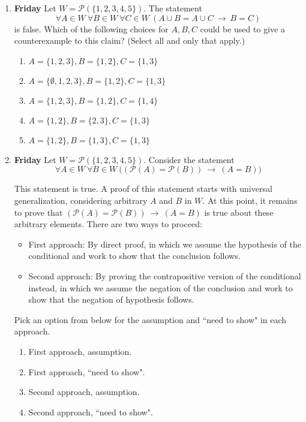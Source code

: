 \documentclass[12pt, oneside]{article}
\begin{document}
\begin{enumerate}
\item {\bf Friday} Let $W =  \mathcal{P}(\{1,2,3,4,5\})$.
The statement $$\forall A \in W~ \forall B\in W~ \forall  C  \in W~  ( A \cup B =  A \cup C ~\to~  B = C) $$ is false.
Which of the following  choices for  $A, B, C$ could  
be used to  give a counterexample to this claim?
(Select all and only that  apply.)
\begin{enumerate}
    \item $A = \{ 1, 2, 3 \}, B = \{ 1, 2\}, C= \{1, 3\}$
    \item $A = \{ \emptyset, 1, 2, 3 \}, B = \{ 1, 2\}, C= \{1, 3\}$
    \item $A = \{ 1, 2, 3 \}, B = \{ 1, 2\}, C= \{1, 4\}$
    \item $A = \{ 1, 2 \}, B = \{ 2, 3\}, C= \{1, 3\}$
    \item $A = \{ 1,2 \}, B =  \{ 1,3\}, C =  \{ 1,3\}$
\end{enumerate}

\item {\bf Friday} Let $W =  \mathcal{P}(\{1,2,3,4,5\})$.
Consider the  statement
$$\forall A \in W~ \forall B\in W~  \big( ( \mathcal{P}(A) = \mathcal{P}(B) )~\to~ (A = B) \big) $$

This statement is true. A proof of this statement starts with universal generalization, considering
arbitrary $A$ and $B$ in $W$. At this point, it remains to prove that $( \mathcal{P}(A) = \mathcal{P}(B) )~\to~ (A = B)$
is true about these arbitrary elements.  There are two ways to proceed: 

\begin{itemize}
\item[] First approach: By direct proof, in which we assume the hypothesis of the 
conditional and work to show that the conclusion follows.
\item[] Second approach: By proving the contrapositive version of the conditional instead, in which we
assume the negation of the conclusion and work to show that the negation of hypothesis follows.
\end{itemize} 
Pick an option from below for the assumption and ``need to show" in each approach.

\begin{enumerate}
    \item First approach, assumption.
    \item First approach, ``need to show".
    \item Second approach, assumption.
    \item Second approach, ``need to show".
\end{enumerate}



\end{enumerate}
\end{document}
